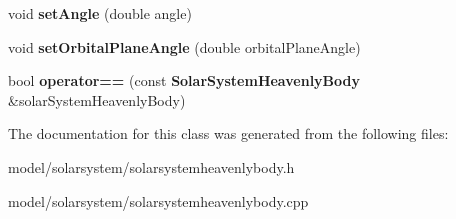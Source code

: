 \begin{DoxyCompactItemize}
\item 
void {\bfseries set\-Angle} (double angle)\label{d9/dbe/classSolarSystemHeavenlyBody_a9090ebb05d92989f60c88a7c4f56cbb8}

\item 
void {\bfseries set\-Orbital\-Plane\-Angle} (double orbital\-Plane\-Angle)\label{d9/dbe/classSolarSystemHeavenlyBody_a4a0e36997ff3c47d15a2623689489252}

\item 
bool {\bfseries operator==} (const {\bf \-Solar\-System\-Heavenly\-Body} \&solar\-System\-Heavenly\-Body)\label{d9/dbe/classSolarSystemHeavenlyBody_a5f34a6913ef4b3266141ef5dc4a39b46}

\end{DoxyCompactItemize}


\-The documentation for this class was generated from the following files\-:\begin{DoxyCompactItemize}
\item 
model/solarsystem/solarsystemheavenlybody.\-h\item 
model/solarsystem/solarsystemheavenlybody.\-cpp\end{DoxyCompactItemize}
